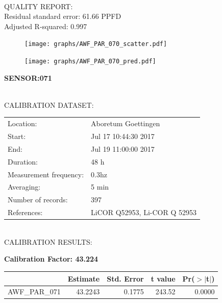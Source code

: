 \documentclass[oneside]{report}
\begin{document}
\hrulefill\\
QUALITY REPORT:\\
Residual standard error: 61.66 PPFD\\
Adjusted R-squared: 0.997



\begin{figure}[H]
  \centering
  \texttt{[image: graphs/AWF\_PAR\_070\_scatter.pdf]}
\end{figure}




\begin{figure}[H]
  \centering
  \texttt{[image: graphs/AWF\_PAR\_070\_pred.pdf]}
\end{figure}

\pagebreak


\begin{center}
\large{\textbf{SENSOR:071}}\\
\end{center}

\hrulefill\\
CALIBRATION DATASET:\\
\begin{table}[h!]
  \centering
  \label{tab:table1}
  \begin{tabular}{ll}
    Location: & Aboretum Goettingen\\ 
    
    
    Start:  & Jul 17 10:44:30 2017 \\
    End:   & Jul 19 11:00:00 2017\\ 
    Duration: & 48 h\\
    Measurement frequency: & 0.3hz\\
    Averaging:  &5 min\\
    Number of records: & 397 \\
    References: & LiCOR Q52953, Li-COR Q 52953 \\
  \end{tabular}
\end{table}

\hrulefill\\
CALIBRATION RESULTS:\\


\begin{center}
\textbf{\large{Calibration Factor: 43.224}}\\
\end{center}
\begin{table}[ht]
\centering
\begin{tabular}{rrrrr}
  \hline
 & Estimate & Std. Error & t value & Pr($>$$|$t$|$) \\ 
  \hline
AWF\_PAR\_071 & 43.2243 & 0.1775 & 243.52 & 0.0000 \\ 
   \hline
\end{tabular}
\end{table}
\end{document}
